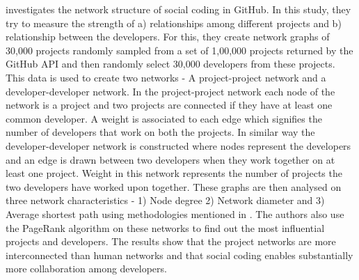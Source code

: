 \cite{Thung2013} investigates the network structure of social coding in GitHub. In this study, they try to measure the strength of a) relationships among different projects and b) relationship between the developers. For this, they create network graphs of 30,000 projects randomly sampled from a set of 1,00,000 projects returned by the GitHub API and then randomly select 30,000 developers from these projects. This data is used to create two networks - A project-project network and a developer-developer network. In the project-project network each node of the network is a project and two projects are connected if they have at least one common developer. A weight is associated to each edge which signifies the number of developers that work on both the projects. In similar way the developer-developer network is constructed where nodes represent the developers and an edge is drawn between two developers when they work together on at least one project. Weight in this network represents the number of projects the two developers have worked upon together. These graphs are then analysed on three network characteristics - 1) Node degree 2) Network diameter and 3) Average shortest path using methodologies mentioned in \cite{Surian2010}. The authors also use the PageRank algorithm on these networks to find out the most influential projects and developers. The results show that the project networks are more interconnected than human networks and that social coding enables substantially more collaboration among developers.

